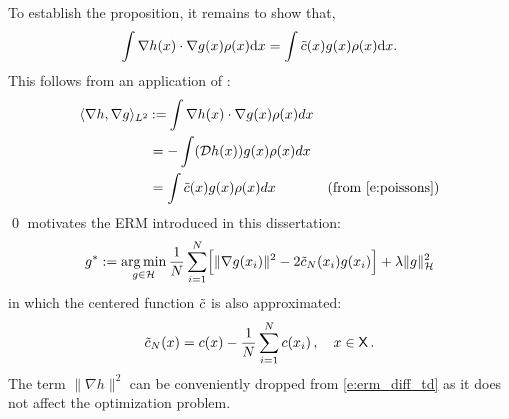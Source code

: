 To establish the proposition, it remains to show that,
\[
\int \nabla h(x) \cdot \nabla g(x) \pr(x) \ud x = \int \tilc(x) g(x) \pr(x) \ud x.
\label{e:transform}
\]
This follows from an application of :
\[
\begin{aligned}
\langle \nabla h, \nabla g \rangle_{L^2} & \mathbin{:=} \int \nabla h(x) \cdot \nabla g(x) \rho(x) dx \\
& = - \int  ({\cal D} h(x)) g(x) \rho(x) dx \\
& = \int \tilde c(x) g(x) \rho(x) dx \qquad & \text{(from \eqref{e:poissons})}
\end{aligned}
\]
\qed
{} motivates the ERM introduced in this dissertation:	
\begin{equation}
g^*  := \argmin_{g \in \clH} \frac{1}{N} \sum_{i=1}^N\Bigl[ \| \nabla g(x_i) \|^2 - 2 \tilc_N(x_i)g(x_i)\Bigr] + \lambda \|g\|^2_\clH
\label{e:erm_diff_td}
\end{equation}
in which the centered function $\tilde c$ is also approximated:
\[
\tilc_N(x) = c(x) - \frac{1}{N}  \sum_{i=1}^N  c(x_i)\,,\quad x\in\state\, .
\label{e:tlcApprox}
\]
The term $\| \nabla h \|^2$ can be conveniently dropped from \eqref{e:erm_diff_td} as it does not affect the optimization problem.


